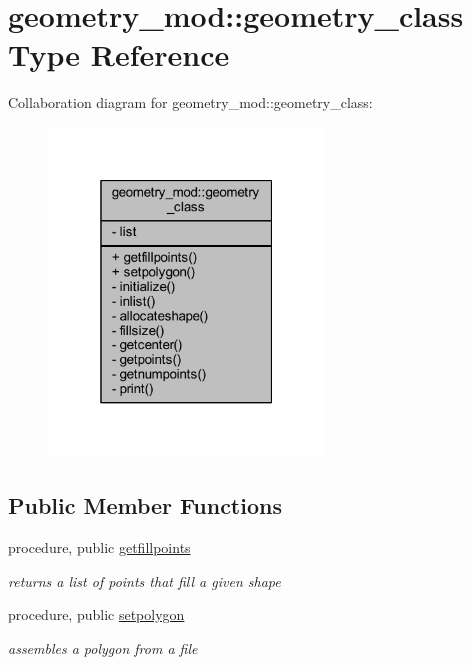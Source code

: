 \hypertarget{structgeometry__mod_1_1geometry__class}{}\section{geometry\+\_\+mod\+:\+:geometry\+\_\+class Type Reference}
\label{structgeometry__mod_1_1geometry__class}


Collaboration diagram for geometry\+\_\+mod\+:\+:geometry\+\_\+class\+:\nopagebreak
\begin{figure}[H]
\begin{center}
\leavevmode
\includegraphics[width=208pt]{structgeometry__mod_1_1geometry__class__coll__graph}
\end{center}
\end{figure}
\subsection*{Public Member Functions}
\begin{DoxyCompactItemize}
\item 
procedure, public \mbox{\hyperlink{structgeometry__mod_1_1geometry__class_aff5dcf860e40f15d8a509f9bc2acdab3}{getfillpoints}}
\begin{DoxyCompactList}\small\item\em returns a list of points that fill a given shape \end{DoxyCompactList}\item 
procedure, public \mbox{\hyperlink{structgeometry__mod_1_1geometry__class_ae9157930057bde1cb5e17ac97071015d}{setpolygon}}
\begin{DoxyCompactList}\small\item\em assembles a polygon from a file \end{DoxyCompactList}\end{DoxyCompactItemize}
